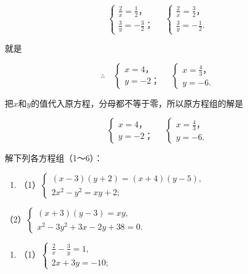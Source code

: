 \[
\left\{ \begin{array}{l} \frac{2}{x} = \frac{1}{2}\text{，} \\ \frac{3}{y} = - \frac{3}{2}\text{；} \end{array} \right. \quad \left\{ \begin{array}{l} \frac{2}{x} = \frac{3}{2}\text{，} \\ \frac{3}{y} = - \frac{1}{2}. \end{array} \right.
\]

就是

\[
\therefore \quad \left\{ \begin{array}{l} x = 4\text{，} \\ y = - 2\text{；} \end{array} \right. \quad \left\{ \begin{array}{l} x = \frac{4}{3}\text{，} \\ y = - 6. \end{array} \right.
\]

把\(x\)和\(y\)的值代入原方程，分母都不等于零，所以原方程组的解是

\[
\left\{ \begin{array}{l} x = 4\text{，} \\ y = - 2\text{；} \end{array} \right. \quad \left\{ \begin{array}{l} x = \frac{4}{3}\text{，} \\ y = - 6. \end{array} \right.
\]

解下列各方程组（1～6）：

\begin{enumerate}
\item
  （1）\(\left\{ \begin{array}{l} (x - 3)(y + 2) = (x + 4)(y - 5), \\ 2x^2 - y^2 = xy + 2; \end{array} \right.\)
\end{enumerate}

（2）\(\left\{ \begin{array}{l} (x + 3)(y - 3) = xy, \\ x^2 - 3y^2 + 3x - 2y + 38 = 0. \end{array} \right.\)

\begin{enumerate}[start=2]
\item
  （1）\(\left\{ \begin{array}{l} \frac{2}{x} - \frac{3}{y} = 1, \\ 2x + 3y = -10; \end{array} \right.\)
\end{enumerate}


